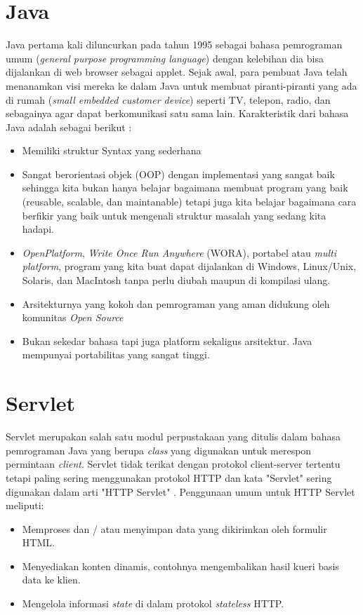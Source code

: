 \newpage
\section{Java}
Java pertama kali diluncurkan pada tahun 1995 sebagai bahasa pemrograman umum (\textit{general purpose programming language}) dengan kelebihan dia bisa dijalankan di web browser sebagai applet. Sejak awal, para pembuat Java telah menanamkan visi mereka ke dalam Java untuk membuat piranti-piranti yang ada di rumah (\textit{small embedded customer device}) seperti TV, telepon, radio, dan sebagainya agar dapat berkomunikasi satu sama lain. Karakteristik dari bahasa Java adalah sebagai berikut : \citep{Utama}
\begin{itemize}
	\itemsep0em
	\item Memiliki struktur Syntax yang sederhana
	\item Sangat berorientasi objek (OOP) dengan implementasi yang sangat baik sehingga
	kita bukan hanya belajar bagaimana membuat program yang baik (reusable,
	scalable, dan maintanable) tetapi juga kita belajar bagaimana cara berfikir yang
	baik untuk mengenali struktur masalah yang sedang kita hadapi.
	\item \textit{OpenPlatform}, \textit{Write Once Run Anywhere} (WORA), portabel atau \textit{multi platform}, program yang kita buat dapat dijalankan di Windows, Linux/Unix, Solaris, dan MacIntosh tanpa perlu diubah maupun di kompilasi ulang.
	\item Arsitekturnya yang kokoh dan pemrograman yang aman didukung oleh komunitas
	\textit{Open Source}
	\item Bukan sekedar bahasa tapi juga platform sekaligus arsitektur. Java mempunyai portabilitas yang sangat tinggi.
\end{itemize}

\section{Servlet}
Servlet merupakan salah satu modul perpustakaan yang ditulis dalam bahasa pemrograman Java yang berupa \textit{class} yang digunakan untuk merespon permintaan \textit{client}. Servlet tidak terikat dengan protokol client-server tertentu tetapi paling sering menggunakan protokol HTTP dan kata "Servlet" sering digunakan dalam arti "HTTP Servlet" \citep{servlet}. Penggunaan umum untuk HTTP Servlet meliputi:
\begin{itemize}
	\itemsep0em
	\item Memproses dan / atau menyimpan data yang dikirimkan oleh formulir HTML.
	\item Menyediakan konten dinamis, contohnya mengembalikan hasil kueri basis data ke klien.
	\item Mengelola informasi \textit{state} di dalam protokol \textit{stateless} HTTP.
\end{itemize}
\newpage
